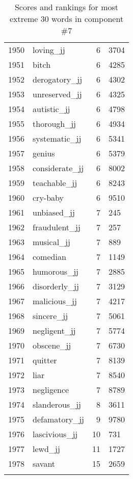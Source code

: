 \begin{longtable}[!htbp]{| rlr@{.}l |}
    1950 & loving\_jj & 6 & 3704 \\
    1951 & bitch & 6 & 4285 \\
    1952 & derogatory\_jj & 6 & 4302 \\
    1953 & unreserved\_jj & 6 & 4325 \\
    1954 & autistic\_jj & 6 & 4798 \\
    1955 & thorough\_jj & 6 & 4934 \\
    1956 & systematic\_jj & 6 & 5341 \\
    1957 & genius & 6 & 5379 \\
    1958 & considerate\_jj & 6 & 8002 \\
    1959 & teachable\_jj & 6 & 8243 \\
    1960 & cry-baby & 6 & 9510 \\
    1961 & unbiased\_jj & 7 & 245 \\
    1962 & fraudulent\_jj & 7 & 257 \\
    1963 & musical\_jj & 7 & 889 \\
    1964 & comedian & 7 & 1149 \\
    1965 & humorous\_jj & 7 & 2885 \\
    1966 & disorderly\_jj & 7 & 3129 \\
    1967 & malicious\_jj & 7 & 4217 \\
    1968 & sincere\_jj & 7 & 5061 \\
    1969 & negligent\_jj & 7 & 5774 \\
    1970 & obscene\_jj & 7 & 6730 \\
    1971 & quitter & 7 & 8139 \\
    1972 & liar & 7 & 8540 \\
    1973 & negligence & 7 & 8789 \\
    1974 & slanderous\_jj & 8 & 3611 \\
    1975 & defamatory\_jj & 9 & 9780 \\
    1976 & lascivious\_jj & 10 & 731 \\
    1977 & lewd\_jj & 11 & 1727 \\
    1978 & savant & 15 & 2659 \\
    \hline
    \caption{Scores and rankings for most extreme 30 words in component \#7} \\
\end{longtable}
